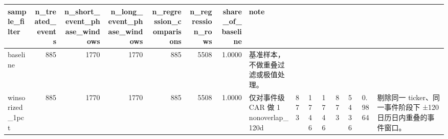 \begin{tabular}{lrrrrrrl}
\toprule
sample_filter & n_treated_events & n_short_event_phase_windows & n_long_event_phase_windows & n_regression_comparisons & n_regression_rows & share_of_baseline & note \\
\midrule
baseline & 885 & 1770 & 1770 & 885 & 5508 & 1.0000 & 基准样本，不做重叠过滤或极值处理。 \\
winsorized_1pct & 885 & 1770 & 1770 & 885 & 5508 & 1.0000 & 仅对事件级 CAR 做 1%
nonoverlap_120d & 873 & 1746 & 1746 & 873 & 5436 & 0.9864 & 剔除同一 ticker、同一事件阶段下 ±120 日历日内重叠的事件窗口。 \\
\bottomrule
\end{tabular}
